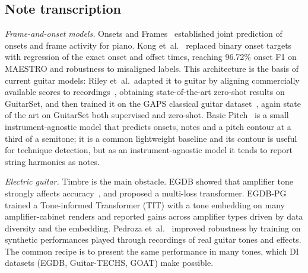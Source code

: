 \subsection{Note transcription}
\label{sec:amt}
\emph{Frame-and-onset models.} Onsets and Frames~\cite{hawthorne2018onsets}
established joint prediction of onsets and frame activity for piano.
Kong et~al.~\cite{kong2021highres} replaced binary onset targets with
regression of the exact onset and offset times, reaching 96.72\% onset F1 on
MAESTRO and robustness to misaligned labels. This architecture is the basis
of current guitar models: Riley et~al.\ adapted it to guitar by aligning
commercially available scores to recordings~\cite{riley2024domain}, obtaining
state-of-the-art zero-shot results on GuitarSet, and then trained it on the
GAPS classical guitar dataset~\cite{riley2024gaps}, again state of the art on
GuitarSet both supervised and zero-shot. Basic Pitch~\cite{bittner2022basicpitch}
is a small instrument-agnostic model that predicts onsets, notes and a pitch
contour at a third of a semitone; it is a common lightweight baseline and its
contour is useful for technique detection, but as an instrument-agnostic
model it tends to report string harmonics as notes.

\emph{Electric guitar.} Timbre is the main obstacle. EGDB showed that
amplifier tone strongly affects accuracy~\cite{chen2022egdb}, and proposed a
multi-loss transformer. EGDB-PG~\cite{chen2025egdbpg} trained a Tone-informed
Transformer (TIT) with a tone embedding on many amplifier-cabinet renders and
reported gains across amplifier types driven by data diversity and the
embedding. Pedroza et~al.~\cite{pedroza2024tones} improved robustness by
training on synthetic performances played through recordings of real guitar
tones and effects. The common recipe is to present the same performance in
many tones, which DI datasets (EGDB, Guitar-TECHS, GOAT) make possible.

